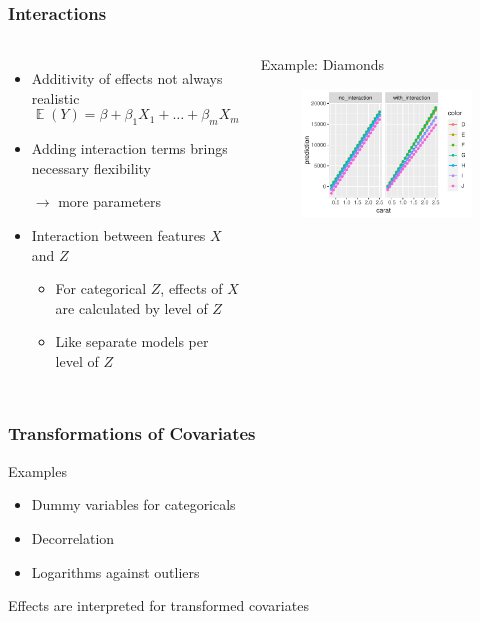 \documentclass[
    utf8,
    aspectratio=169
]{beamer}  %
\DeclareMathOperator{\E}{\mathbb{E}}  %
\begin{document}
\begin{frame}
	\frametitle{Interactions}
	\begin{columns}
		\begin{itemize}
			\item Additivity of effects not always realistic
			$$
				\E(Y) = \beta + \beta_1 X_1 + \dots + \beta_m X_m
			$$
			\item Adding interaction terms brings necessary flexibility 
			
			$\rightarrow$ more parameters
			\item Interaction between features $X$ and $Z$
			\begin{itemize}
				\item For categorical $Z$, effects of $X$ are calculated by level of $Z$
				\item Like separate models per level of $Z$
			\end{itemize}
		\end{itemize}
		
		\begin{block}{\centering Example: Diamonds}
			\begin{figure}
				\includegraphics[width=\textwidth]{pics/interaction.pdf}
			\end{figure}
		\end{block}
	\end{columns}
\end{frame}

\begin{frame}
	\frametitle{Transformations of Covariates}
	\begin{block}{Examples}
		\begin{itemize}
			\item Dummy variables for categoricals
			\item Decorrelation
			\item Logarithms against outliers
		\end{itemize}
	\end{block}
	
	\vfill
	
	Effects are interpreted for transformed covariates
\end{frame}
\end{document}

